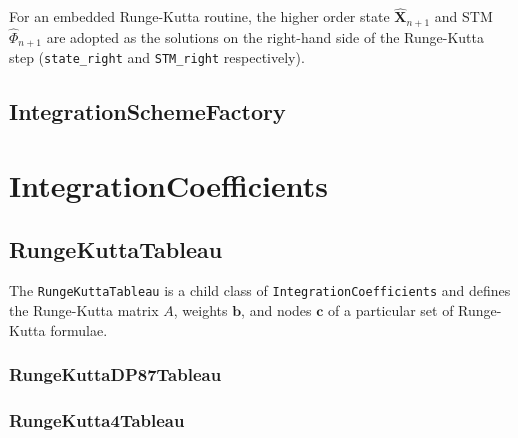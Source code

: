 \noindent For an embedded Runge-Kutta routine, the higher order state $\hat{\mathbf{X}}_{n+1}$ and STM $\hat{\Phi}_{n+1}$ are adopted as the solutions on the right-hand side of the Runge-Kutta step (\texttt{state\_right} and \texttt{STM\_right} respectively).


\subsection{IntegrationSchemeFactory}
\label{sec:IntegrationSchemeFactory}


\section{IntegrationCoefficients}
\label{sec:IntegrationCoefficients}



\subsection{RungeKuttaTableau}
\label{sec:RungeKuttaTableau}

The \texttt{RungeKuttaTableau} is a child class of \texttt{IntegrationCoefficients} and defines the Runge-Kutta matrix $A$, weights $\mathbf{b}$, and nodes $\mathbf{c}$ of a particular set of Runge-Kutta formulae.

\subsubsection{RungeKuttaDP87Tableau}
\label{sec:RungeKuttaTableau}

\subsubsection{RungeKutta4Tableau}
\label{sec:RungeKuttaTableau}


